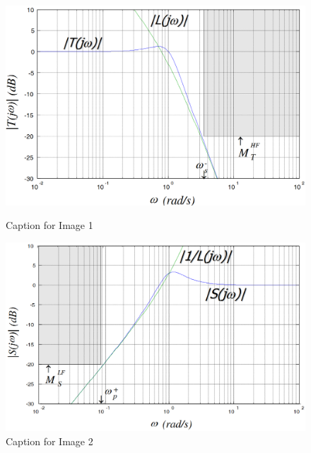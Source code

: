 \documentclass{article}
\begin{document}
	\begin{figure}[htbp]
		\centering
		\begin{minipage}{0.45\textwidth} %
			\centering
			\includegraphics[width=\linewidth]{constraints_ds.png} %
			\caption{Caption for Image 1}
			\label{fig:image1}
		\end{minipage}
		\hfill %
		\vrule width 0.5pt %
		\hfill %
		\begin{minipage}{0.45\textwidth} %
			\centering
			\includegraphics[width=\linewidth]{constraints_dp.png} %
			\caption{Caption for Image 2}
			\label{fig:image2}
		\end{minipage}
	\end{figure}
	
\end{document}
